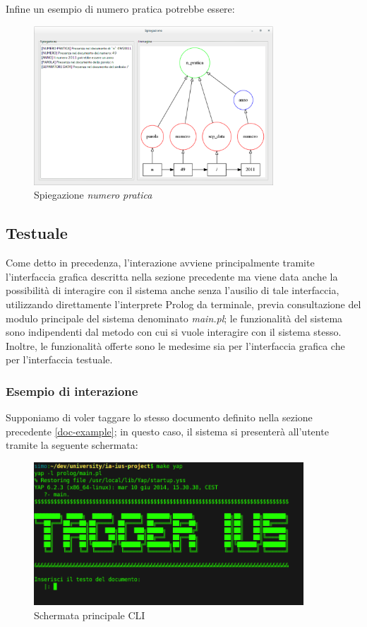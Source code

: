 Infine un esempio di numero pratica potrebbe essere:

\begin{figure}[H]
	\centering
	\includegraphics[width=0.8\textwidth]{img/interfaces/java-pratica.png}
	\caption[Schermata java explain numero pratica]{Spiegazione \emph{numero pratica}}
	\label{java-pratica}
\end{figure}

\subsection{Testuale}
Come detto in precedenza, l’interazione avviene principalmente tramite l'interfaccia grafica descritta nella sezione precedente ma viene data anche la possibilità di interagire con il sistema anche senza l'ausilio di tale interfaccia, utilizzando direttamente l'interprete Prolog da terminale, previa consultazione del modulo principale del sistema denominato \emph{main.pl}; le funzionalità del sistema sono indipendenti dal metodo con cui si vuole interagire con il sistema stesso. Inoltre, le funzionalità offerte sono le medesime sia per l'interfaccia grafica che per l'interfaccia testuale.

\subsubsection{Esempio di interazione}
Supponiamo di voler taggare lo stesso documento definito nella sezione precedente \ref{doc-example}; in questo caso, il sistema si presenterà all'utente tramite la seguente schermata:

\begin{figure}[H]
	\centering
	\includegraphics[width=0.9\textwidth]{img/interfaces/CLI-main.png}
	\caption[Schermata CLI main]{Schermata principale CLI}
	\label{CLI-main}
\end{figure}

